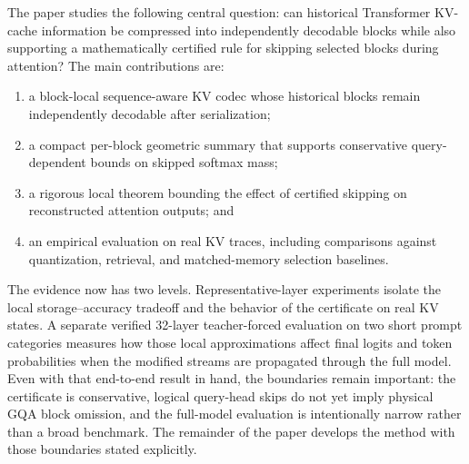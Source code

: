 The paper studies the following central question: can historical Transformer KV-cache information be compressed into independently decodable blocks while also supporting a mathematically certified rule for skipping selected blocks during attention? The main contributions are:
\begin{enumerate}[leftmargin=1.6em,label=(\roman*)]
  \item a block-local sequence-aware KV codec whose historical blocks remain independently decodable after serialization;
  \item a compact per-block geometric summary that supports conservative query-dependent bounds on skipped softmax mass;
  \item a rigorous local theorem bounding the effect of certified skipping on reconstructed attention outputs; and
  \item an empirical evaluation on real \modeldisplay{} KV traces, including comparisons against quantization, retrieval, and matched-memory selection baselines.
\end{enumerate}

The evidence now has two levels. Representative-layer experiments isolate the local storage--accuracy tradeoff and the behavior of the certificate on real KV states. A separate verified 32-layer teacher-forced evaluation on two short prompt categories measures how those local approximations affect final logits and token probabilities when the modified streams are propagated through the full model. Even with that end-to-end result in hand, the boundaries remain important: the certificate is conservative, logical query-head skips do not yet imply physical GQA block omission, and the full-model evaluation is intentionally narrow rather than a broad benchmark. The remainder of the paper develops the method with those boundaries stated explicitly.
